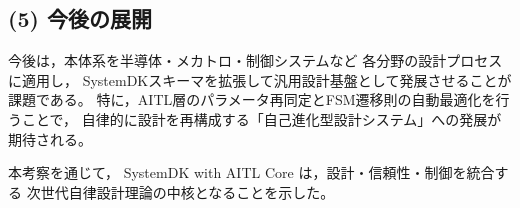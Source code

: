 \subsection{(5) 今後の展開}
今後は，本体系を半導体・メカトロ・制御システムなど
各分野の設計プロセスに適用し，
SystemDKスキーマを拡張して汎用設計基盤として発展させることが課題である。
特に，AITL層のパラメータ再同定とFSM遷移則の自動最適化を行うことで，
自律的に設計を再構成する「自己進化型設計システム」への発展が期待される。

本考察を通じて，
SystemDK with AITL Core は，設計・信頼性・制御を統合する
次世代自律設計理論の中核となることを示した。
